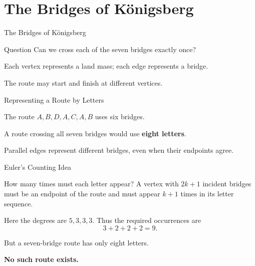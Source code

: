 \documentclass[aspectratio=169,11pt]{beamer}
\begin{document}
\section{The Bridges of K\"onigsberg}
\begin{frame}{The Bridges of Königsberg}
\large
\begin{block}{Question}
Can we cross each of the seven bridges exactly once?
\end{block}
\begin{center}\end{center}Each vertex represents a land mass; each edge represents a bridge.\par\smallskip The route may start and finish at different vertices.
\end{frame}

\begin{frame}{Representing a Route by Letters}
\large
\begin{center}\end{center}The route $A,B,D,A,C,A,B$ uses six bridges.\par\medskip A route crossing all seven bridges would use \textbf{eight letters}.\par\medskip Parallel edges represent different bridges, even when their endpoints agree.
\end{frame}

\begin{frame}{Euler's Counting Idea}
\large
\begin{block}{How many times must each letter appear?}
A vertex with $2k+1$ incident bridges must be an endpoint of the route and must appear $k+1$ times in its letter sequence.
\end{block}
\medskip Here the degrees are $5,3,3,3$. Thus the required occurrences are\[3+2+2+2=9.\]\par But a seven-bridge route has only eight letters.\par\medskip\textbf{No such route exists.}
\end{frame}
\end{document}

